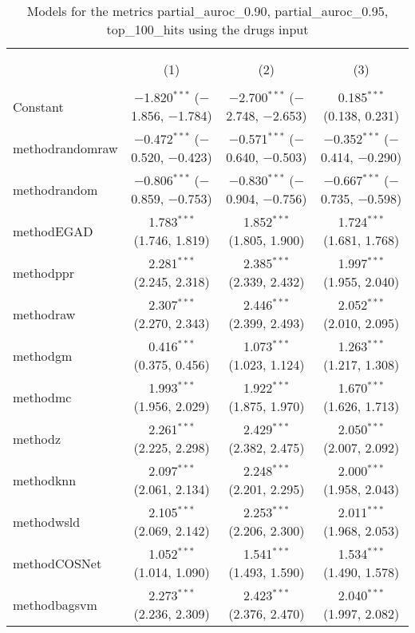 
\begin{table}[!htbp] \centering 
  \caption{Models for the metrics partial_auroc_0.90, partial_auroc_0.95, top_100_hits using the drugs input} 
  \label{} 
\begin{tabular}{@{\extracolsep{5pt}}lccc} 
\\[-1.8ex]\hline 
\hline \\[-1.8ex] 
\\[-1.8ex] & (1) & (2) & (3)\\ 
\hline \\[-1.8ex] 
 Constant & $-$1.820$^{***}$ ($-$1.856, $-$1.784) & $-$2.700$^{***}$ ($-$2.748, $-$2.653) & 0.185$^{***}$ (0.138, 0.231) \\ 
  methodrandomraw & $-$0.472$^{***}$ ($-$0.520, $-$0.423) & $-$0.571$^{***}$ ($-$0.640, $-$0.503) & $-$0.352$^{***}$ ($-$0.414, $-$0.290) \\ 
  methodrandom & $-$0.806$^{***}$ ($-$0.859, $-$0.753) & $-$0.830$^{***}$ ($-$0.904, $-$0.756) & $-$0.667$^{***}$ ($-$0.735, $-$0.598) \\ 
  methodEGAD & 1.783$^{***}$ (1.746, 1.819) & 1.852$^{***}$ (1.805, 1.900) & 1.724$^{***}$ (1.681, 1.768) \\ 
  methodppr & 2.281$^{***}$ (2.245, 2.318) & 2.385$^{***}$ (2.339, 2.432) & 1.997$^{***}$ (1.955, 2.040) \\ 
  methodraw & 2.307$^{***}$ (2.270, 2.343) & 2.446$^{***}$ (2.399, 2.493) & 2.052$^{***}$ (2.010, 2.095) \\ 
  methodgm & 0.416$^{***}$ (0.375, 0.456) & 1.073$^{***}$ (1.023, 1.124) & 1.263$^{***}$ (1.217, 1.308) \\ 
  methodmc & 1.993$^{***}$ (1.956, 2.029) & 1.922$^{***}$ (1.875, 1.970) & 1.670$^{***}$ (1.626, 1.713) \\ 
  methodz & 2.261$^{***}$ (2.225, 2.298) & 2.429$^{***}$ (2.382, 2.475) & 2.050$^{***}$ (2.007, 2.092) \\ 
  methodknn & 2.097$^{***}$ (2.061, 2.134) & 2.248$^{***}$ (2.201, 2.295) & 2.000$^{***}$ (1.958, 2.043) \\ 
  methodwsld & 2.105$^{***}$ (2.069, 2.142) & 2.253$^{***}$ (2.206, 2.300) & 2.011$^{***}$ (1.968, 2.053) \\ 
  methodCOSNet & 1.052$^{***}$ (1.014, 1.090) & 1.541$^{***}$ (1.493, 1.590) & 1.534$^{***}$ (1.490, 1.578) \\ 
  methodbagsvm & 2.273$^{***}$ (2.236, 2.309) & 2.423$^{***}$ (2.376, 2.470) & 2.040$^{***}$ (1.997, 2.082) \\ 

\end{tabular}
\end{table}

